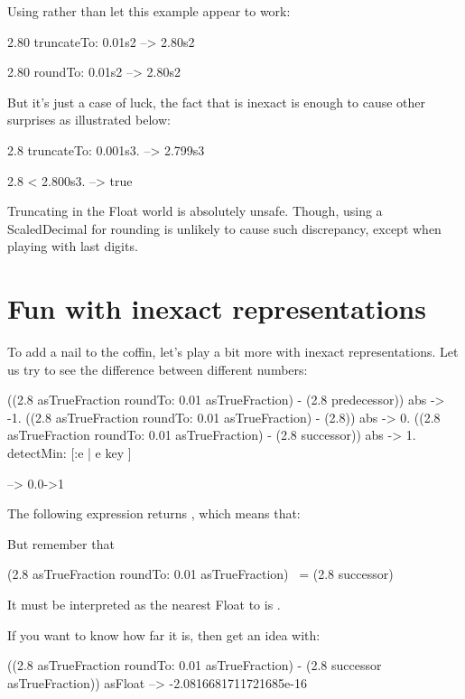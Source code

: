 \documentclass[a4paper,10pt,twoside]{book}
\begin{document}
Using  rather than   let this example appear to work:
\begin{code}{}
2.80 truncateTo: 0.01s2
	-->  2.80s2
	
2.80 roundTo: 0.01s2
	-->  2.80s2
\end{code}

But it's just a case of luck, the fact that  is inexact is enough to cause other surprises as illustrated below:
\begin{code}{}
2.8 truncateTo: 0.001s3.
	--> 2.799s3
	
2.8 < 2.800s3.
	--> true
\end{code}

Truncating in the Float world is absolutely unsafe. Though, using a ScaledDecimal for rounding is unlikely to cause such discrepancy, except when playing with last digits.



\section{Fun with inexact representations}
To add a nail to the coffin, let's play a bit more with inexact representations. Let us try to see the difference between different numbers: 

\begin{code}{}
{
((2.8 asTrueFraction roundTo: 0.01 asTrueFraction) - (2.8 predecessor)) abs -> -1.
((2.8 asTrueFraction roundTo: 0.01 asTrueFraction) - (2.8)) abs -> 0.
((2.8 asTrueFraction roundTo: 0.01 asTrueFraction) - (2.8 successor)) abs -> 1.
} detectMin: [:e | e key ]

--> 0.0->1
\end{code}

The following expression returns , which means that:

But remember that 

\begin{code}{}
(2.8 asTrueFraction roundTo: 0.01 asTrueFraction) ~= (2.8 successor)
\end{code}

It must be interpreted as the nearest Float to  is .

If you want to know how far it is, then get an idea with:

\begin{code}{}
((2.8 asTrueFraction roundTo: 0.01 asTrueFraction) - (2.8 successor asTrueFraction)) asFloat
	--> -2.0816681711721685e-16
\end{code}
\end{document}
